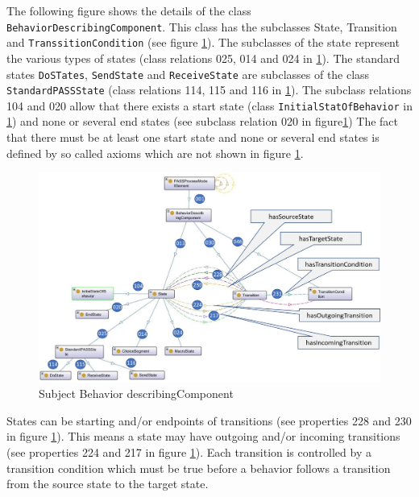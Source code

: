 The following figure shows the details of the class \texttt{BehaviorDescribingComponent}. This class has the subclasses State, Transition and \texttt{TranssitionCondition} (see figure \ref{fig:20190104-behavior-describing-component}). The subclasses of the state represent the various types of states (class relations 025, 014 and 024 in \ref{fig:20190104-behavior-describing-component}). The standard states \texttt{DoSTates}, \texttt{SendState} and \texttt{ReceiveState} are subclasses of the class \texttt{StandardPASSState} (class relations 114, 115 and 116 in \ref{fig:20190104-behavior-describing-component}). The subclass relations 104 and 020 allow that there exists a start state (class \texttt{InitialStatOfBehavior} in \ref{fig:20190104-behavior-describing-component}) and none or several end states (see subclass relation 020 in figure\ref{fig:20190104-behavior-describing-component}) The fact that there must be at least one start state and none or several end states is defined by so called axioms which are not shown in figure \ref{fig:20190104-behavior-describing-component}.

\begin{figure}[htbp]
	\centering
	\includegraphics[width=1.0\linewidth]{Figures/Ontology/SubjectExecution/20190104-Behavior-describing-component}
	\caption[Subject Behavior describingComponent]{Subject Behavior describingComponent}
	\label{fig:20190104-behavior-describing-component}
\end{figure}

States can be starting and/or endpoints of transitions (see properties 228 and 230 in figure \ref{fig:20190104-behavior-describing-component}). This means a state may have outgoing and/or incoming transitions (see properties 224 and 217 in figure \ref{fig:20190104-behavior-describing-component}). Each transition is controlled by a transition condition which must be true before a behavior follows a transition from the source state to the target state.

